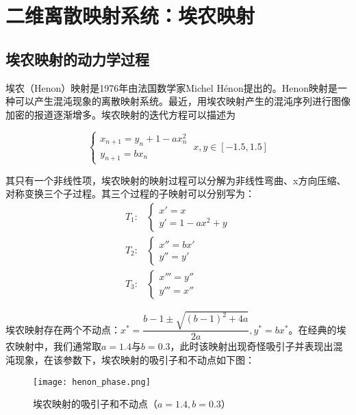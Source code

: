 \section{二维离散映射系统：埃农映射}

\subsection{埃农映射的动力学过程}

埃农（Henon）映射是1976年由法国数学家Michel H\'{e}non提出的。Henon映射是一种可以产生混沌现象的离散映射系统。最近，用埃农映射产生的混沌序列进行图像加密的报道逐渐增多。埃农映射的迭代方程可以描述为

\begin{equation}
    \begin{cases}
        x_{n+1}=y_n+1-ax_n^2\\
        y_{n+1}=bx_n
    \end{cases}\ x,y\in [-1.5,1.5]
\end{equation}

其只有一个非线性项，埃农映射的映射过程可以分解为非线性弯曲、x方向压缩、对称变换三个子过程。其三个过程的子映射可以分别写为：
\begin{equation}
    \begin{aligned}
        T_1: & \begin{cases}
            x'=x\\
            y'=1-ax^2+y
        \end{cases}\\
        T_2: & \begin{cases}
            x''=bx'\\
            y''=y'
        \end{cases}\\
        T_3: & \begin{cases}
            x'''=y''\\
            y'''=x''
        \end{cases}
    \end{aligned}
\end{equation}

埃农映射存在两个不动点：$x^*=\dfrac{b-1\pm\sqrt{(b-1)^2+4a}}{2a},y^*=bx^*$。在经典的埃农映射中，我们通常取$a=1.4$与$b=0.3$，此时该映射出现奇怪吸引子并表现出混沌现象，在该参数下，埃农映射的吸引子和不动点如下图：
\begin{figure}
	\centering
	\texttt{[image: henon\_phase.png]}
    \caption{埃农映射的吸引子和不动点（$a=1.4,b=0.3$）}
    \label{fig:logi_lypn}
\end{figure}

